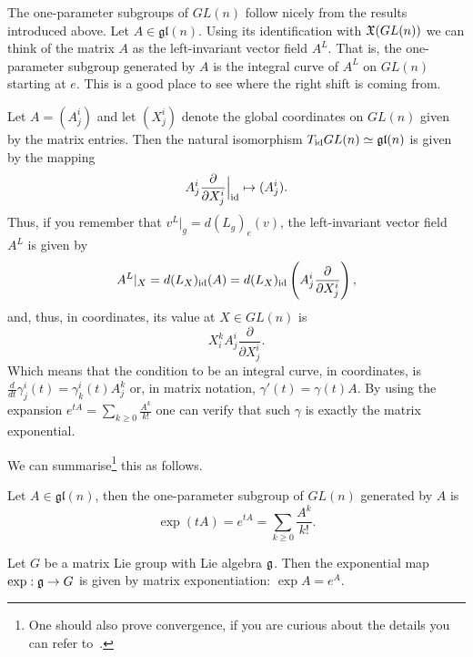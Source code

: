 The one-parameter subgroups of $GL(n)$ follow nicely from the results introduced above.
Let $A\in\mathfrak{gl}(n)$. Using its identification with $\mathfrak{X}(GL(n))$ we can think of the matrix $A$ as the left-invariant vector field $A^L$.
That is, the one-parameter subgroup generated by $A$ is the integral curve of $A^L$ on $GL(n)$ starting at $e$.
This is a good place to see where the right shift is coming from.

Let $A = (A^i_j)$ and let $(X^i_j)$ denote the global coordinates on $GL(n)$ given by the matrix entries.
Then the natural isomorphism $T_{\operatorname{id}}GL(n) \simeq \mathfrak{gl}(n)$ is given by the mapping
\begin{equation}
  A^i_j \frac{\partial }{\partial X^i_j}\Big|_{\operatorname{id}} \mapsto (A^i_j).
\end{equation}
Thus, if you remember that $v^L|_g = d(L_g)_e(v)$, the left-invariant vector field $A^L$ is given by
\begin{equation}
  A^L|_X = d(L_X)_{\operatorname{id}}(A) = d(L_X)_{\operatorname{id}}\left(A^i_j \frac{\partial }{\partial X^i_j}\right),
\end{equation}
and, thus, in coordinates, its value at $X\in GL(n)$ is
\begin{equation}
  X^k_i A^i_j \frac{\partial }{\partial X^i_j}.
\end{equation}
Which means that the condition to be an integral curve, in coordinates, is $\frac{d}{dt}\gamma^i_j(t) = \gamma^i_k(t) A^k_j$ or, in matrix notation, $\gamma'(t) = \gamma(t) A$.
By using the expansion $e^{tA} = \sum_{k\geq 0} \frac{A^k}{k!}$ one can verify that such $\gamma$ is exactly the matrix exponential.

We can summarise\footnote{One should also prove convergence, if you are curious about the details you can refer to~\cite[Proposition 20.2]{book:lee}.} this as follows.

\begin{proposition}\label{prop:expmat}
  Let $A\in\mathfrak{gl}(n)$, then the one-parameter subgroup of $GL(n)$ generated by $A$ is
  \begin{equation}
    \exp(tA) = e^{tA} = \sum_{k\geq 0} \frac{A^k}{k!}.
  \end{equation}
\end{proposition}

\begin{corollary}
  Let $G$ be a matrix Lie group with Lie algebra $\mathfrak{g}$.
  Then the exponential map $\exp:\mathfrak{g}\to G$ is given by matrix exponentiation: $\exp A = e^A$.
\end{corollary}

